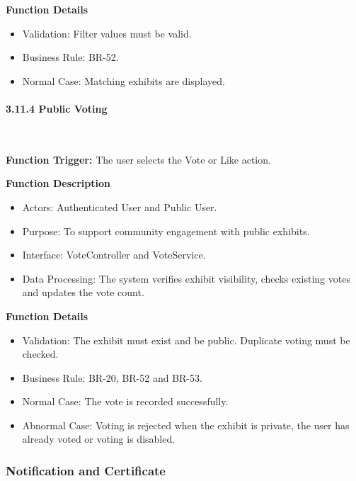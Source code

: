 \textbf{Function Details}
\begin{itemize}[leftmargin=1.5em, nosep]
    \item Validation: Filter values must be valid.
    \item Business Rule: BR-52.
    \item Normal Case: Matching exhibits are displayed.
\end{itemize}

\paragraph*{3.11.4 Public Voting}\leavevmode\\[-0.5em]
\label{par:public-voting}

\textbf{Function Trigger:} The user selects the Vote or Like action.

\textbf{Function Description}
\begin{itemize}[leftmargin=1.5em, nosep]
    \item Actors: Authenticated User and Public User.
    \item Purpose: To support community engagement with public exhibits.
    \item Interface: VoteController and VoteService.
    \item Data Processing: The system verifies exhibit visibility, checks existing votes and updates the vote count.
\end{itemize}

\textbf{Function Details}
\begin{itemize}[leftmargin=1.5em, nosep]
    \item Validation: The exhibit must exist and be public. Duplicate voting must be checked.
    \item Business Rule: BR-20, BR-52 and BR-53.
    \item Normal Case: The vote is recorded successfully.
    \item Abnormal Case: Voting is rejected when the exhibit is private, the user has already voted or voting is disabled.
\end{itemize}

\subsubsection{Notification and Certificate}
\label{subsubsec:notification-certificate}

